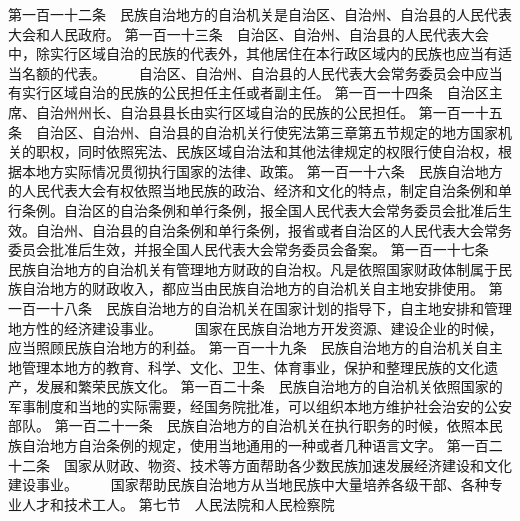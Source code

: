      第一百一十二条　民族自治地方的自治机关是自治区、自治州、自治县的人民代表大会和人民政府。
     第一百一十三条　自治区、自治州、自治县的人民代表大会中，除实行区域自治的民族的代表外，其他居住在本行政区域内的民族也应当有适当名额的代表。
 　　自治区、自治州、自治县的人民代表大会常务委员会中应当有实行区域自治的民族的公民担任主任或者副主任。
     第一百一十四条　自治区主席、自治州州长、自治县县长由实行区域自治的民族的公民担任。
     第一百一十五条　自治区、自治州、自治县的自治机关行使宪法第三章第五节规定的地方国家机关的职权，同时依照宪法、民族区域自治法和其他法律规定的权限行使自治权，根据本地方实际情况贯彻执行国家的法律、政策。
     第一百一十六条　民族自治地方的人民代表大会有权依照当地民族的政治、经济和文化的特点，制定自治条例和单行条例。自治区的自治条例和单行条例，报全国人民代表大会常务委员会批准后生效。自治州、自治县的自治条例和单行条例，报省或者自治区的人民代表大会常务委员会批准后生效，并报全国人民代表大会常务委员会备案。
     第一百一十七条　民族自治地方的自治机关有管理地方财政的自治权。凡是依照国家财政体制属于民族自治地方的财政收入，都应当由民族自治地方的自治机关自主地安排使用。
     第一百一十八条　民族自治地方的自治机关在国家计划的指导下，自主地安排和管理地方性的经济建设事业。
　　国家在民族自治地方开发资源、建设企业的时候，应当照顾民族自治地方的利益。
     第一百一十九条　民族自治地方的自治机关自主地管理本地方的教育、科学、文化、卫生、体育事业，保护和整理民族的文化遗产，发展和繁荣民族文化。
     第一百二十条　民族自治地方的自治机关依照国家的军事制度和当地的实际需要，经国务院批准，可以组织本地方维护社会治安的公安部队。
     第一百二十一条　民族自治地方的自治机关在执行职务的时候，依照本民族自治地方自治条例的规定，使用当地通用的一种或者几种语言文字。
     第一百二十二条　国家从财政、物资、技术等方面帮助各少数民族加速发展经济建设和文化建设事业。
　　国家帮助民族自治地方从当地民族中大量培养各级干部、各种专业人才和技术工人。
第七节　人民法院和人民检察院

